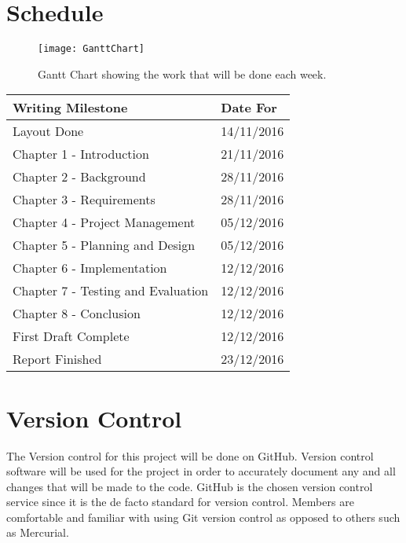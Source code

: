 \section{Schedule}
\begin{figure}[H]
	\texttt{[image: GanttChart]}
	\centering
	\caption{Gantt Chart showing the work that will be done each week.}
	\label{fig:ganttChartPlan}
\end{figure}
\clearpage
\begin{tabular}{ |p{6cm}|p{3cm}| }
	\hline
	Writing Milestone & Date For
	\\\hline
	Layout Done & 14/11/2016
	\\\hline
	Chapter 1 - Introduction & 21/11/2016
	\\\hline
	Chapter 2 - Background & 28/11/2016
	\\\hline
	Chapter 3 - Requirements & 28/11/2016
	\\\hline
	Chapter 4 - Project Management & 05/12/2016
	\\\hline
	Chapter 5 - Planning and Design & 05/12/2016
	\\\hline
	Chapter 6 - Implementation & 12/12/2016
	\\\hline
	Chapter 7 - Testing and Evaluation & 12/12/2016
	\\\hline
	Chapter 8 - Conclusion & 12/12/2016
	\\\hline
	First Draft Complete & 12/12/2016
	\\\hline
	Report Finished & 23/12/2016
	\\\hline
\end{tabular}

\section{Version Control}
The Version control for this project will be done on GitHub. Version control software will be used for the project in order to accurately document any and all changes that will be made to the code. GitHub is the chosen version control service since it is the de facto standard for version control. Members are comfortable and familiar with using Git version control as opposed to others such as Mercurial.


